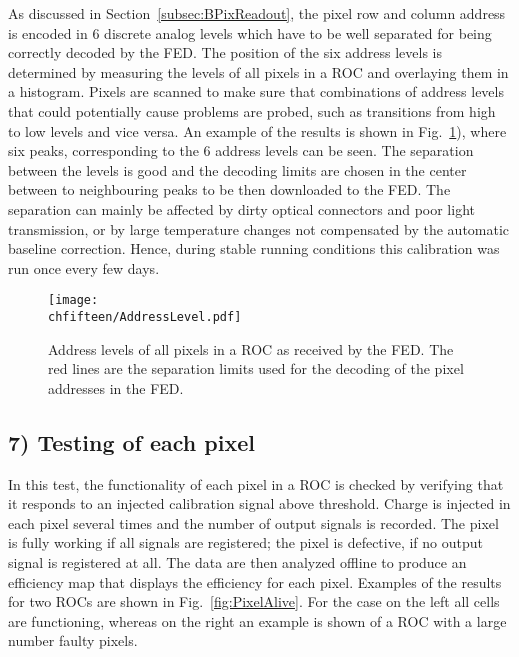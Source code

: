As discussed in Section~\ref{subsec:BPixReadout}, the pixel row and column address is encoded in 6 discrete analog levels which have to be well separated for being correctly decoded by the FED.
The position of the six address levels is determined by measuring the levels of all pixels in a ROC and overlaying them in a histogram.
Pixels are scanned to make sure that combinations of address levels that could potentially cause problems are probed, such as transitions from high to low levels and vice versa.
An example of the results is shown in Fig.~\ref{fig:AddressLevel}), where six peaks, corresponding to the 6 address levels can be seen.
The separation between the levels is good and the decoding limits are chosen in the center between to neighbouring peaks to be then downloaded to the FED.
The separation can mainly be affected by dirty optical connectors and poor light transmission, or by large temperature changes not compensated by the automatic baseline correction. Hence, during stable running conditions this calibration was run once every few days.

\begin{figure}[!htb]
 \begin{center}
 \texttt{[image: \\chfifteen/AddressLevel.pdf]}
 \end{center}
 \caption{Address levels of all pixels in a ROC as received by the FED. The red lines are the separation limits used for the decoding of the pixel addresses in the FED.}
 \label{fig:AddressLevel}
\end{figure}

\subsection*{7) Testing of each pixel}

In this test, the functionality of each pixel in a ROC is checked by verifying that it responds to an injected calibration signal above threshold.
Charge is injected in each pixel several times and the number of output signals is recorded.
The pixel is fully working if all signals are registered; the pixel is defective, if no output signal is registered at all.
The data are then analyzed offline to produce an efficiency map that displays the efficiency for each pixel. Examples of the results for two ROCs are shown in Fig.~\ref{fig:PixelAlive}.
For the case on the left all cells are functioning, whereas on the right an example is shown of a ROC with a large number faulty pixels.

